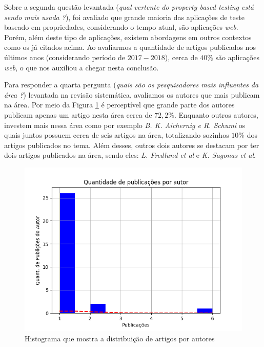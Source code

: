	
	Sobre a segunda questão levantada (\textit{qual vertente do property based testing está sendo mais usada ?}), foi avaliado que grande maioria das aplicações de teste baseado em propriedades, considerando o tempo atual, são aplicações \textit{web}. Porém, além deste tipo de aplicações, existem abordagens em outros contextos como os já citados acima. Ao avaliarmos a quantidade de artigos publicados nos últimos anos (considerando período de $2017-2018$), cerca de $40\%$ são aplicações \textit{web}, o que nos auxiliou a chegar nesta conclusão. 


	Para responder a quarta pergunta (\textit{quais são os pesquisadores mais influentes da área ?}) levantada na revisão sistemática, avaliamos os autores que mais publicam na área. Por meio da Figura \ref{fig:histograma} é perceptível que grande parte dos autores publicam apenas um artigo nesta área cerca de $72,2\%$. Enquanto outros autores, investem mais nessa área como por exemplo \textit{B. K. Aichernig e R. Schumi} os quais juntos possuem cerca de seis artigos na área, totalizando sozinhos $10\%$ dos artigos publicados no tema. Além desses, outros dois autores se destacam por ter dois artigos publicados na área, sendo eles: \textit{L. Fredlund et al} e \textit{K. Sagonas et al}.

	\begin{figure}[!ht]
	  \centering
	  \includegraphics[scale=0.5]{Imagens/histograma.png}
	  \caption{Histograma que mostra a distribuição de artigos por autores}
      \label{fig:histograma}
	\end{figure}

